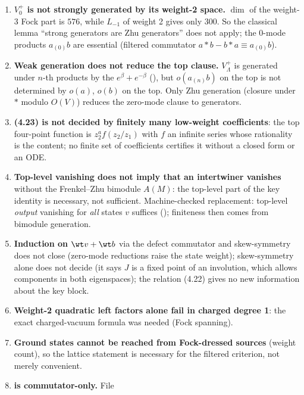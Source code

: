 \begin{enumerate}
  $\varphi$, or everything), and excluding the second case needs information about $A(V_0^+)$ beyond
  its image. What irreducibility does give is uniqueness of $\varphi$ up to scalar.
\item \textbf{$V_0^+$ is not strongly generated by its weight-2 space.} $\dim$ of the weight-3 Fock
  part is $576$, while $L_{-1}$ of weight 2 gives only $300$. So the classical lemma ``strong
  generators are Zhu generators'' does not apply; the 0-mode products $a_{(0)}b$ are essential
  (filtered commutator $a*b-b*a\equiv a_{(0)}b$).
\item \textbf{Weak generation does not reduce the top clause.} $V_\Lambda^+$ is generated under
  $n$-th products by the $e^\beta+e^{-\beta}$ (), but $o(a_{(n)}b)$ on the
  top is not determined by $o(a)$, $o(b)$ on the top. Only Zhu generation (closure under $*$ modulo
  $O(V)$) reduces the zero-mode clause to generators.
\item \textbf{(4.23) is not decided by finitely many low-weight coefficients}: the top four-point
  function is $z_2^af(z_2/z_1)$ with $f$ an infinite series whose rationality is the content; no
  finite set of coefficients certifies it without a closed form or an ODE.
\item \textbf{Top-level vanishing does not imply that an intertwiner vanishes} without the
  Frenkel--Zhu bimodule $A(M)$: the top-level part of the key identity is necessary, not
  sufficient. Machine-checked replacement: top-level \emph{output} vanishing for \emph{all} states
  $v$ suffices (); finiteness then comes from bimodule generation.
\item \textbf{Induction on $\wt v+\wt b$} via the defect commutator and skew-symmetry does not
  close (zero-mode reductions raise the state weight); skew-symmetry alone does not decide
   (it says $J$ is a fixed point of an involution, which allows components in both
  eigenspaces); the relation (4.22) gives no new information about the key block.
\item \textbf{Weight-2 quadratic left factors alone fail in charged degree 1}: the exact
  charged-vacuum formula  was needed (Fock spanning).
\item \textbf{Ground states cannot be reached from Fock-dressed sources} (weight count), so the
  lattice statement  is necessary for the filtered criterion, not merely
  convenient.
\item \textbf{ is commutator-only.} File

\end{enumerate}
